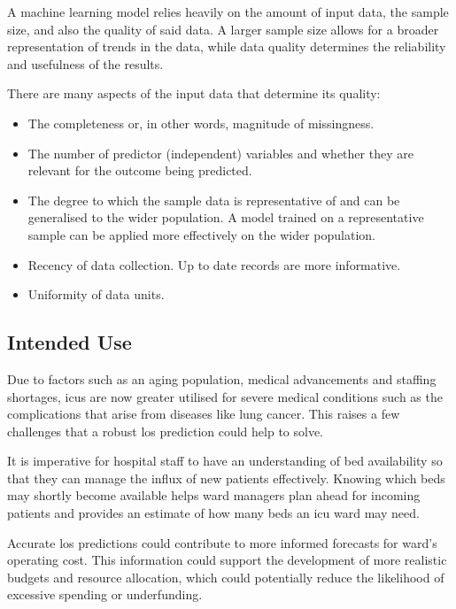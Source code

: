 \documentclass[11pt]{article}
\begin{document}
A machine learning model relies heavily on the amount of input data, the sample size, and also the quality of said data\cite{Chen2019}. A larger sample size allows for a broader representation of trends in the data, while data quality determines the reliability and usefulness of the results.\cite{Johnson2017}

There are many aspects of the input data that determine its quality: \begin{itemize}
\item The completeness or, in other words, magnitude of missingness. 
\item The number of predictor (independent) variables and whether they are relevant for the outcome being predicted.
\item The degree to which the sample data is representative of and can be generalised to the wider population. A model trained on a representative sample can be applied more effectively on the wider population. 
\item  Recency of data collection. Up to date records are more informative.
\item Uniformity of data units.

\end{itemize}

\subsection{Intended Use}

Due to factors such as an aging population, medical advancements and staffing shortages, \gls{icu}s are now greater utilised for severe medical conditions such as the complications that arise from diseases like lung cancer\cite{Halpern2016}. This raises a few challenges that a robust \gls{los} prediction could help to solve.

It is imperative for hospital staff to have an understanding of bed availability so that they can manage the influx of new patients effectively. Knowing which beds may shortly become available helps ward managers plan ahead for incoming patients and provides an estimate of how many beds an \gls{icu} ward may need. 

Accurate \gls{los} predictions could contribute to more informed forecasts for ward's operating cost. This information could support the development of more realistic budgets and resource allocation,  which could potentially reduce the likelihood of excessive spending or underfunding.
\end{document}
